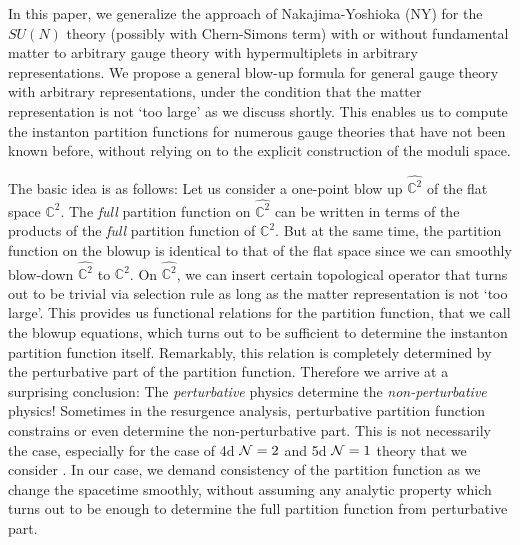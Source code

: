 \documentclass[letterpaper, 11pt]{article}
\def\IC{\mathbb{C}}
\def\CN{{\cal N}}
\begin{document}
In this paper, we generalize the approach of Nakajima-Yoshioka (NY) \cite{Nakajima:2003pg,Nakajima:2003uh,Nakajima:2005fg, Gottsche:2006bm, Nakajima:2009qjc, Gottsche:2010ig} for the $SU(N)$ theory (possibly with Chern-Simons term) with or without fundamental matter to arbitrary gauge theory with hypermultiplets in arbitrary representations. We propose a general blow-up formula for general gauge theory with arbitrary representations, under the condition that the matter representation is not `too large' as we discuss shortly. This enables us to compute the instanton partition functions for numerous gauge theories that have not been known before, without relying on to the explicit construction of the moduli space. 

The basic idea is as follows: Let us consider a one-point blow up $\hat{\IC^2}$ of the flat space $\IC^2$. The \emph{full} partition function on $\hat{\IC^2}$ can be written in terms of the products of the \emph{full} partition function of $\IC^2$. But at the same time, the partition function on the blowup is identical to that of the flat space since we can smoothly blow-down $\hat{\IC^2}$ to $\IC^2$. On $\hat{\IC^2}$, we can insert certain topological operator that turns out to be trivial via selection rule as long as the matter representation is not `too large'. This provides us functional relations for the partition function, that we call the blowup equations, which turns out to be sufficient to determine the instanton partition function itself. Remarkably, this relation is completely determined by the perturbative part of the partition function. Therefore we arrive at a surprising conclusion: The \emph{perturbative} physics determine the \emph{non-perturbative} physics! Sometimes in the resurgence analysis, perturbative partition function constrains or even determine the non-perturbative part. This is not necessarily the case, especially for the case of 4d $\CN=2$ and 5d $\CN=1$ theory that we consider \cite{Honda:2016mvg}. In our case, we demand consistency of the partition function as we change the spacetime smoothly, without assuming any analytic property which turns out to be enough to determine the full partition function from perturbative part. 
\end{document}
